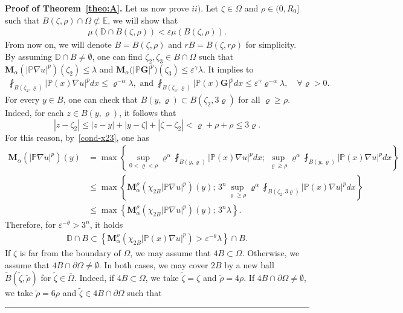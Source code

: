 \documentclass[a4paper, 11pt]{article}
\newenvironment{proof}[1][Proof]{\textbf{#1.} }{\hfill\rule{0.5em}{0.5em}}
\begin{document}
\begin{proof}[Proof of Theorem~\ref{theo:A}]
Let us now prove $ii)$. Let $\zeta\in \Omega$ and $\rho \in (0,R_0]$ such that $B(\zeta,\rho)\cap \Omega \not\subset \mathbb{E}$, we will show that
\begin{align}\label{goal-2}
\mu(\mathbb{D}\cap B(\zeta,\rho)) < \varepsilon \mu(B(\zeta,\rho)).
\end{align}
From now on, we will denote $B = B(\zeta,\rho)$ and $rB = B(\zeta, r\rho)$ for simplicity. By assuming $\mathbb{D}\cap B \neq \emptyset$, one can find  $\zeta_2, \zeta_3 \in B \cap \Omega$ such that $\mathbf{M}_{\alpha}(|\mathbb{P} \nabla u|^{p})(\zeta_2) \le \lambda$ and $\mathbf{M}_{\alpha}\big(|\mathbb{P} \mathbf{G}|^{p}\big)(\zeta_3) \le \varepsilon^{\gamma}\lambda$. It implies to
\begin{align}\label{cond-x23}
\fint_{B(\zeta_2,\varrho)} |\mathbb{P}(x) \nabla u|^{p} dx \le \varrho^{-\alpha}\lambda, \mbox{ and }
 \fint_{B(\zeta_3,\varrho)} |\mathbb{P}(x) \mathbf{G}|^{p} dx \le \varepsilon^{\gamma} \varrho^{-\alpha}  \lambda, \quad \forall \varrho>0.
\end{align}
For every $y \in B$, one can check that $B(y,\varrho) \subset B(\zeta_2,3\varrho)$ for all $\varrho \ge \rho$. Indeed, for each $z \in B(y,\varrho)$, it follows that
$$|z - \zeta_2| \le |z-y| + |y -\zeta| + |\zeta - \zeta_2| < \varrho + \rho + \rho \le 3 \varrho.$$
For this reason, by~\eqref{cond-x23}, one has\begin{align*}
\mathbf{M}_{\alpha}(|\mathbb{P}\nabla u|^{p})(y) & = \max\left\{\sup_{0<\varrho<\rho} \varrho^{\alpha} \fint_{B(y,\varrho)} |\mathbb{P}(x)\nabla u|^{p} dx; \, \sup_{\varrho \ge \rho} \varrho^{\alpha} \fint_{B(y,\varrho)} |\mathbb{P}(x)\nabla u|^{p} dx\right\} \\
& \le \max\left\{\mathbf{M}_{\alpha}^{\rho}(\chi_{2B}|\mathbb{P}\nabla u|^{p})(y); \,  3^n \sup_{\varrho \ge \rho} \varrho^{\alpha} \fint_{B(\zeta_2,3\varrho)} |\mathbb{P}(x)\nabla u|^{p} dx\right\} \\
& \le \max\left\{\mathbf{M}_{\alpha}^{\rho}(\chi_{2B}|\mathbb{P}\nabla u|^{p})(y); \,  3^n \lambda\right\}.
\end{align*}
Therefore, for $\varepsilon^{-\theta}>3^n$, it holds
\begin{align}\label{est-ii-1}
\mathbb{D}\cap B \subset \left\{\mathbf{M}_{\alpha}^{\rho}(\chi_{2B}|\mathbb{P}(x)\nabla u|^{p}) > \varepsilon^{-\theta}\lambda\right\} \cap B.
\end{align}
If $\zeta$ is far from the boundary of $\Omega$, we may assume that $4B \subset \Omega$. Otherwise, we assume that $4B \cap \partial \Omega \neq \emptyset$. In both cases, we may cover $2B$ by a new ball $\tilde{B}(\tilde{\zeta},\tilde{\rho})$ for $\tilde{\zeta} \in \overline{\Omega}$. Indeed, if $4B \subset \Omega$, we take $\tilde{\zeta} = \zeta$ and $\tilde{\rho} = 4\rho$. If $4B \cap \partial \Omega \neq \emptyset$, we take $\tilde{\rho} = 6\rho$ and $\tilde{\zeta} \in 4B \cap \partial \Omega$ such that 

\end{proof}
\end{document}
